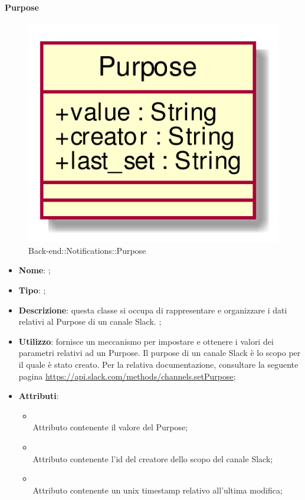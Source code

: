 \hypertarget{Purpose_label}{\paragraph{Purpose}}
\begin{figure}[h]
	\centering
	\includegraphics[width=\textwidth,height=\textheight,keepaspectratio]{images/ClassPurpose.png}
	\caption{Back-end::Notifications::Purpose}
\end{figure}
\begin{itemize}
	\item \textbf{Nome}: ;
	\item \textbf{Tipo}: ;
	\item \textbf{Descrizione}: questa classe si occupa di rappresentare e organizzare i dati relativi al Purpose di un canale Slack.
;
	\item \textbf{Utilizzo}: fornisce un meccanismo per impostare e ottenere i valori dei parametri relativi ad un Purpose.
Il purpose di un canale Slack è lo scopo per il quale è stato creato.
Per la relativa documentazione, consultare la seguente pagina \url{https://api.slack.com/methods/channels.setPurpose};
	\item \textbf{Attributi}:
	\begin{itemize}
		\item[]  \\
		Attributo contenente il valore del Purpose;
		\item[]  \\
		Attributo contenente l'id del creatore dello scopo del canale Slack;
		\item[]  \\
		Attributo contenente un unix timestamp relativo all'ultima modifica;
	\end{itemize}
\end{itemize}

